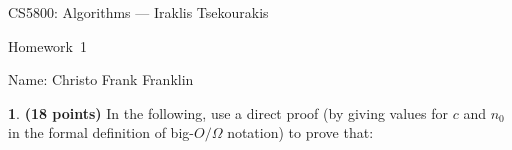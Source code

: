 \documentclass[11pt]{article}
\theoremstyle{definition}
\newcommand{\instructor}{Iraklis Tsekourakis}
\newcommand{\hwnum}{1}
\newtheorem{prob}{}
\begin{document}
{\Large 
\begin{center}{CS5800: Algorithms} ---  \instructor \end{center}}
{\large
\vspace{10pt}
\noindent Homework~\hwnum \vspace{2pt}%
}

\bigskip
{\large \noindent Name: Christo Frank Franklin }


\vspace{15pt}

\begin{prob} \textbf{(18 points)} In the following, use a direct proof (by giving values for $c$ and $n_0$ in the formal definition of big-$O/\Omega$ notation) to prove that:
\end{prob}
\end{document}

